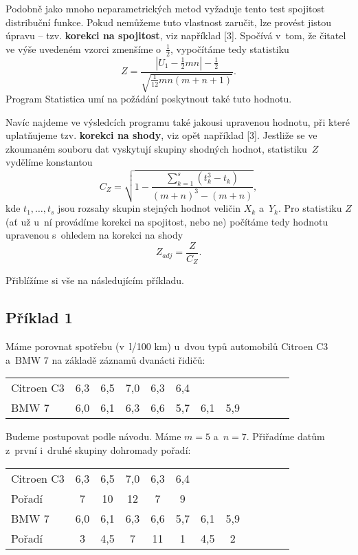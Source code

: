 Podobně jako mnoho neparametrických metod vyžaduje tento test spojitost distribuční funkce. Pokud nemůžeme tuto vlastnost zaručit, lze provést jistou úpravu -- tzv. {\bf korekci na spojitost}, viz například [3]. Spočívá v~tom, že čitatel ve výše uvedeném vzorci zmenšíme o~$\frac12$, vypočítáme tedy statistiku
$$Z=\frac{|U_1-\frac12mn|-\frac12}{\sqrt{\frac1{12}mn(m+n+1)}} .$$
Program Statistica umí na požádání poskytnout také tuto hodnotu.

Navíc najdeme ve výsledcích programu také jakousi upravenou hodnotu, při které uplatňujeme  tzv. {\bf korekci na shody}, viz opět například [3].
Jestliže se ve zkoumaném souboru dat vyskytují skupiny shodných hodnot, statistiku~$Z$ vydělíme konstantou
$$ C_Z=\sqrt{1-\frac{\sum_{k=1}^s (t_k^3-t_k)}{(m+n)^3-(m+n)}} , $$
kde $t_1,\dots , t_s$ jsou rozsahy skupin stejných hodnot veličin $X_k$ a~$Y_k$. Pro statistiku $Z$ (ať už u~ní provádíme korekci na spojitost, nebo ne)
počítáme tedy hodnotu upravenou s~ohledem na korekci na shody
$$ Z_{adj}=\frac{Z}{C_{Z}}. $$

Přiblížíme si vše na následujícím příkladu.

\subsection*{Příklad 1}
Máme porovnat spotřebu (v~l/100 km) u~dvou typů automobilů Citroen C3 a~BMW 7 na základě záznamů dvanácti řidičů:

\begin{table}[!ht]
\centering
\begin{tabular}{lccccccccccc}
Citroen C3  & 6,3 & 6,5 & 7,0 & 6,3 & 6,4 &     & \\[3pt]
BMW 7       & 6,0 & 6,1 & 6,3 & 6,6 & 5,7 & 6,1 & 5,9
\end{tabular}
\end{table}

Budeme postupovat podle návodu. Máme $m=5$ a~$n=7$. Přiřadíme datům z~první i~druhé skupiny dohromady pořadí:

\begin{table}[!ht]
\centering
\begin{tabular}{lccccccccccc}
Citroen C3  & 6,3 & 6,5 & 7,0 & 6,3 & 6,4 &     & \\
Pořadí      & 7   &  10 &  12 &  7  &  9  &     & \\
\hline
BMW 7       & 6,0 & 6,1 & 6,3 & 6,6 & 5,7 & 6,1 & 5,9 \\
Pořadí      & 3   & 4,5 &  7  & 11  &  1  & 4,5 & 2
\end{tabular}
\end{table}

